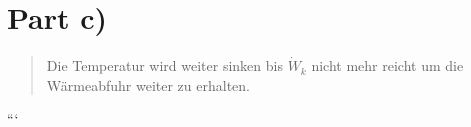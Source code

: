 \section*{Part c)}

\begin{quote}
    Die Temperatur wird weiter sinken bis $\dot{W}_k$ nicht mehr reicht um die Wärmeabfuhr weiter zu erhalten.
\end{quote}

```